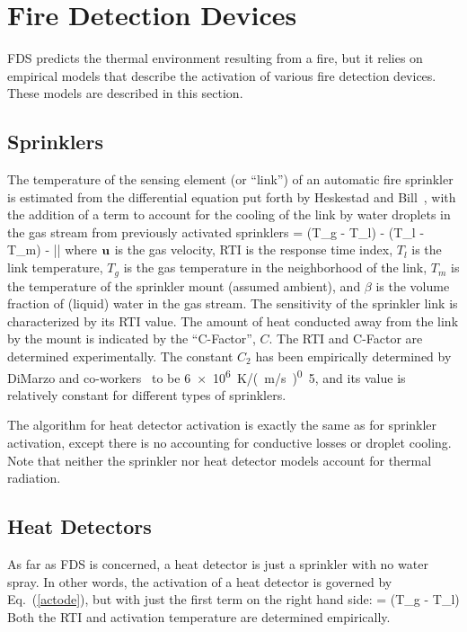 
\chapter{Fire Detection Devices}

FDS predicts the thermal environment resulting from a fire, but it relies on empirical models that describe the
activation of various fire detection devices. These models are described in this section.


\section{Sprinklers}

The temperature of the sensing element (or ``link'') of an automatic fire sprinkler is estimated from
the differential equation put forth by Heskestad and Bill~\cite{Heskestad:3},
with the addition of a term to account for the cooling of the link
by water droplets in the gas stream from previously activated
sprinklers
\be {} =  (T_g - T_l) -
    (T_l - T_m) -  \beta |\bu|
   \label{actode} \ee
where ${\bf u}$ is the gas velocity, RTI is the response time index, $T_l$ is the link temperature,
$T_g$ is the gas temperature in the neighborhood of the link,
$T_m$ is the temperature of the sprinkler mount (assumed ambient),
and $\beta$ is the volume fraction of (liquid) water in the
gas stream. The sensitivity of the sprinkler link is characterized by
its RTI value. The amount of heat conducted away from the
link by the mount is indicated by the ``C-Factor'', $C$. The RTI and
C-Factor are determined experimentally. The constant
$C_2$ has been empirically determined by DiMarzo and
co-workers~\cite{Ruffino:1,Ruffino:2,Gavelli:1} to
be \SI{6e6}{K/(m/s)^0.5}, and its value is relatively constant
for different types of sprinklers.

The algorithm for heat detector activation is exactly the same as for
sprinkler activation, except there is no accounting for conductive losses or
droplet cooling. Note that neither the sprinkler nor heat detector models account for
thermal radiation.

\section{Heat Detectors}

As far as FDS is concerned, a heat detector is just a sprinkler with no water spray. In other words, the activation of a heat
detector is governed by Eq.~(\ref{actode}), but with just the first term on the right hand side:
\be {} =  (T_g - T_l)  \label{heatactode} \ee
Both the RTI and activation temperature are determined empirically.


